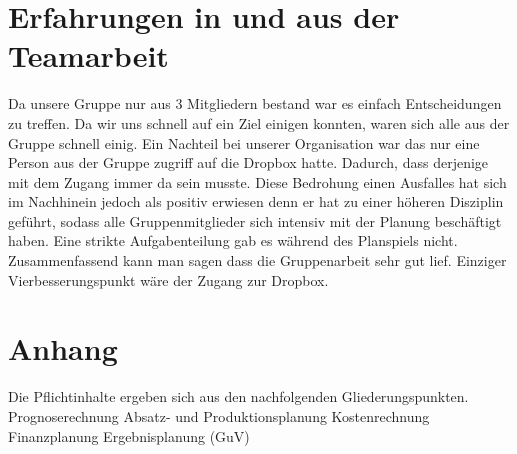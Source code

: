 \documentclass[a4paper, 12pt]{article}
\begin{document}
\begin{flushleft}
\section{Erfahrungen in und aus der Teamarbeit}
Da unsere Gruppe nur aus 3 Mitgliedern bestand war es einfach Entscheidungen zu treffen.
Da wir uns schnell auf ein Ziel einigen konnten, waren sich alle aus der Gruppe schnell einig.
Ein Nachteil bei unserer Organisation war das nur eine Person aus der Gruppe zugriff auf die Dropbox hatte.
Dadurch, dass derjenige mit dem Zugang immer da sein musste.
Diese Bedrohung einen Ausfalles hat sich im Nachhinein jedoch als positiv erwiesen denn er hat zu einer höheren Disziplin geführt, sodass alle Gruppenmitglieder sich intensiv mit der Planung beschäftigt haben.
Eine strikte Aufgabenteilung gab es während des Planspiels nicht.
Zusammenfassend kann man sagen dass die Gruppenarbeit sehr gut lief.
Einziger Vierbesserungspunkt wäre  der Zugang zur Dropbox. 


\section{Anhang}



Die Pflichtinhalte ergeben sich aus den nachfolgenden Gliederungspunkten.
Prognoserechnung
Absatz- und Produktionsplanung
Kostenrechnung
Finanzplanung
Ergebnisplanung (GuV)

%
%


\centering
%
%
 
 
  









 

\end{flushleft}
\end{document}
